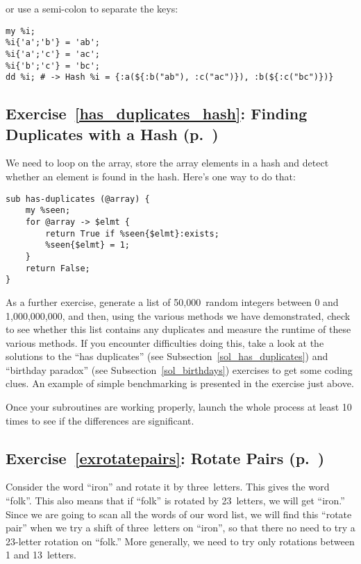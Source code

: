 or use a semi-colon to separate the keys:

\begin{verbatim}
my %i;
%i{'a';'b'} = 'ab';
%i{'a';'c'} = 'ac';
%i{'b';'c'} = 'bc';
dd %i; # -> Hash %i = {:a(${:b("ab"), :c("ac")}), :b(${:c("bc")})}
\end{verbatim}
%

\subsection{Exercise~\ref{has_duplicates_hash}: Finding Duplicates with a Hash (p.~\pageref{has_duplicates_hash})}
\label{sol_has_duplicates_hash}

We need to loop on the array, store the array elements in 
a hash and detect whether an element is found in the hash. 
Here's one way to do that:

\begin{verbatim}
sub has-duplicates (@array) {
    my %seen;
    for @array -> $elmt {
        return True if %seen{$elmt}:exists;
        %seen{$elmt} = 1;
    }
    return False;
}
\end{verbatim}

As a further exercise, generate a list of 50,000~random 
integers between 0 and 1,000,000,000, and then, using 
the various methods we have demonstrated, check to see 
whether this list contains any duplicates and measure the 
runtime of these various methods. If you encounter difficulties doing 
this, take a look at the solutions to the ``has duplicates'' 
(see Subsection~\ref{sol_has_duplicates}) and ``birthday paradox'' (see 
Subsection~\ref{sol_birthdays}) exercises to get some coding clues. An 
example of simple benchmarking is presented in the exercise just 
above.

Once your subroutines are working properly, launch the 
whole process at least 10 times to see if the differences 
are significant.

\subsection{Exercise~\ref{exrotatepairs}: Rotate Pairs (p.~\pageref{exrotatepairs})}
\label{sol_exrotatepairs}

Consider the word ``iron'' and rotate it by three~letters. This 
gives the word ``folk''. This also means that if ``folk'' 
is rotated by 23~letters, we will get ``iron.'' Since 
we are going to scan all the words of our word list, we will 
find this ``rotate pair'' when we try a shift of three~letters 
on ``iron'', so that there no need to try a 23-letter rotation 
on ``folk.'' More generally, we need to try only rotations 
between 1 and 13~letters. 

